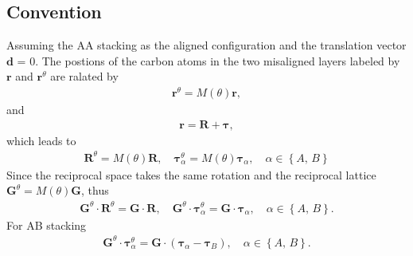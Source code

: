 \documentclass[10pt, oneside]{article}
\newcommand{\te}{\theta}
\newcommand{\p}[1]{\left(#1\right)}
\newcommand{\br}[1]{\left\{#1\right\}}
\begin{document}
\subsection{Convention}
Assuming the AA stacking as the aligned configuration and the translation vector \(\bm{d}\) = 0. The postions of the carbon atoms in the two misaligned layers labeled by \(\bm{r}\) and \(\bm{r}^\theta\) are ralated by 
\begin{align}
	\bm{r}^\theta = M\p{\theta} \bm{r} ,
\end{align}
and 
\begin{align}
	\bm{r} = \bm{R} + \bm{\tau},
\end{align}
which leads to 
\begin{align}
	\bm{R}^{\te} = M\p{\te} \bm{R},\quad \bm{\tau}^{\te}_{\alpha} = M \p{\te} \bm{\tau}_{\alpha}, \quad \alpha \in \br{A,\, B}
\end{align}
Since the reciprocal space takes the same rotation and the reciprocal lattice \(\bm{G}^{\te} =M\p{\te} \bm{G}\), thus 
\begin{align}
	\bm{G}^{\te} \cdot \bm{R}^{\te} = \bm{G} \cdot \bm{R}, \quad \bm{G}^{\te} \cdot \bm{\tau}^{\te}_{\alpha} = \bm{G} \cdot \bm{\tau}_{\alpha}, \quad \alpha \in \br{A ,\, B}.
\end{align}
For AB stacking 
\begin{align}
	\bm{G}^{\te} \cdot \bm{\tau}^{\te}_{\alpha} = \bm{G} \cdot \p{\bm{\tau}_{\alpha} - \bm{\tau}_{B}}, \quad \alpha \in \br{A,\, B}.
\end{align}
\end{document}
